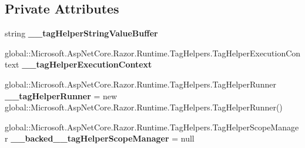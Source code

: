 \subsection*{Private Attributes}
\begin{DoxyCompactItemize}
\item 
\mbox{\label{class_projeto_e_s_w_1_1_areas_1_1_identity_1_1_pages_1_1_areas___identity___pages_____validation_scripts_partial_ad7bb0da641845e1c934bdb125458ef1b}} 
string {\bfseries \+\_\+\+\_\+tag\+Helper\+String\+Value\+Buffer}
\item 
\mbox{\label{class_projeto_e_s_w_1_1_areas_1_1_identity_1_1_pages_1_1_areas___identity___pages_____validation_scripts_partial_a87b3acb17017005512199f7c2cda4de4}} 
global\+::\+Microsoft.\+Asp\+Net\+Core.\+Razor.\+Runtime.\+Tag\+Helpers.\+Tag\+Helper\+Execution\+Context {\bfseries \+\_\+\+\_\+tag\+Helper\+Execution\+Context}
\item 
\mbox{\label{class_projeto_e_s_w_1_1_areas_1_1_identity_1_1_pages_1_1_areas___identity___pages_____validation_scripts_partial_a34ff80f6f13d3a3088fc1231175be643}} 
global\+::\+Microsoft.\+Asp\+Net\+Core.\+Razor.\+Runtime.\+Tag\+Helpers.\+Tag\+Helper\+Runner {\bfseries \+\_\+\+\_\+tag\+Helper\+Runner} = new global\+::\+Microsoft.\+Asp\+Net\+Core.\+Razor.\+Runtime.\+Tag\+Helpers.\+Tag\+Helper\+Runner()
\item 
\mbox{\label{class_projeto_e_s_w_1_1_areas_1_1_identity_1_1_pages_1_1_areas___identity___pages_____validation_scripts_partial_a119a99e86e4ca38ea711a40fc7ff6922}} 
global\+::\+Microsoft.\+Asp\+Net\+Core.\+Razor.\+Runtime.\+Tag\+Helpers.\+Tag\+Helper\+Scope\+Manager {\bfseries \+\_\+\+\_\+backed\+\_\+\+\_\+tag\+Helper\+Scope\+Manager} = null
\item 
\mbox{\label{class_projeto_e_s_w_1_1_areas_1_1_identity_1_1_pages_1_1_areas___identity___pages_____validation_scripts_partial_a948ae1604a9c20bc04b194f7d49e380c}} 

\end{DoxyCompactItemize}
